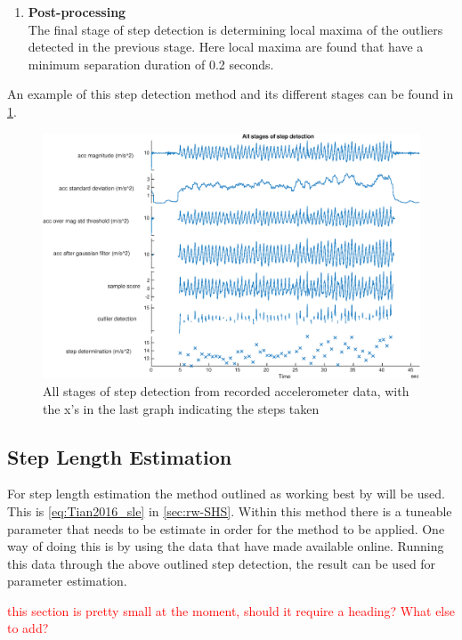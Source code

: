 \begin{enumerate}
	
	\item \textbf{Post-processing} \\
	The final stage of step detection is determining local maxima of the outliers detected in the previous stage. Here local maxima are found that have a minimum separation duration of 0.2 seconds.
	
\end{enumerate}

An example of this step detection method and its different stages can be found in \cref{fig:all_stages_of_step_detection}.

\begin{figure}[H]
	\centering
	\includegraphics[width=1\linewidth]{images/20200924_1204_All_stages_of_step_detection}
	\caption[All stages of step detection ]{All stages of step detection from recorded accelerometer data, with the x's in the last graph indicating the steps taken }
	\label{fig:all_stages_of_step_detection}
\end{figure}
\subsection*{Step Length Estimation}
For step length estimation the method outlined as working best by \cite{Vezocnik2019} will be used. This is \eqref{eq:Tian2016_sle} in \cref{sec:rw-SHS}. Within this method there is a tuneable parameter that needs to be estimate in order for the method to be applied. One way of doing this is by using the data that \cite{Vezocnik2019} have made available online. Running this data through the above outlined step detection, the result can be used for parameter estimation.

\textcolor{red}{this section is pretty small at the moment, should it require a heading? What else to add?}

